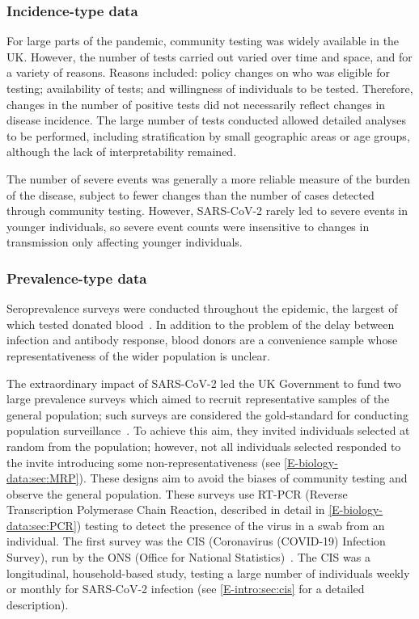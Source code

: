 \documentclass[thesis.tex]{subfiles}
\begin{document}
\subsubsection{Incidence-type data}

For large parts of the pandemic, community testing was widely available in the UK.
However, the number of tests carried out varied over time and space, and for a variety of reasons.
Reasons included: policy changes on who was eligible for testing; availability of tests; and willingness of individuals to be tested.
Therefore, changes in the number of positive tests did not necessarily reflect changes in disease incidence.
The large number of tests conducted allowed detailed analyses to be performed, including stratification by small geographic areas or age groups, although the lack of interpretability remained.

The number of severe events was generally a more reliable measure of the burden of the disease, subject to fewer changes than the number of cases detected through community testing.
However, SARS-CoV-2 rarely led to severe events in younger individuals, so severe event counts were insensitive to changes in transmission only affecting younger individuals.

\subsubsection{Prevalence-type data}

Seroprevalence surveys were conducted throughout the epidemic, the largest of which tested donated blood~\autocite{amirthalingamSeroprevalence}.
In addition to the problem of the delay between infection and antibody response, blood donors are a convenience sample whose representativeness of the wider population is unclear.

The extraordinary impact of SARS-CoV-2 led the UK Government to fund two large prevalence surveys which aimed to recruit representative samples of the general population; such surveys are considered the gold-standard for conducting population surveillance~\autocite{mccabeCISincidence}.
To achieve this aim, they invited individuals selected at random from the population; however, not all individuals selected responded to the invite introducing some non-representativeness (see \cref{E-biology-data:sec:MRP}).
These designs aim to avoid the biases of community testing and observe the general population.
These surveys use RT-PCR (Reverse Transcription Polymerase Chain Reaction, described in detail in \cref{E-biology-data:sec:PCR}) testing to detect the presence of the virus in a swab from an individual.
The first survey was the CIS (Coronavirus (COVID-19) Infection Survey), run by the ONS (Office for National Statistics)~\autocite{CIS,cisMethodsONS}.
The CIS was a longitudinal, household-based study, testing a large number of individuals weekly or monthly for SARS-CoV-2 infection (see \cref{E-intro:sec:cis} for a detailed description).
\end{document}
